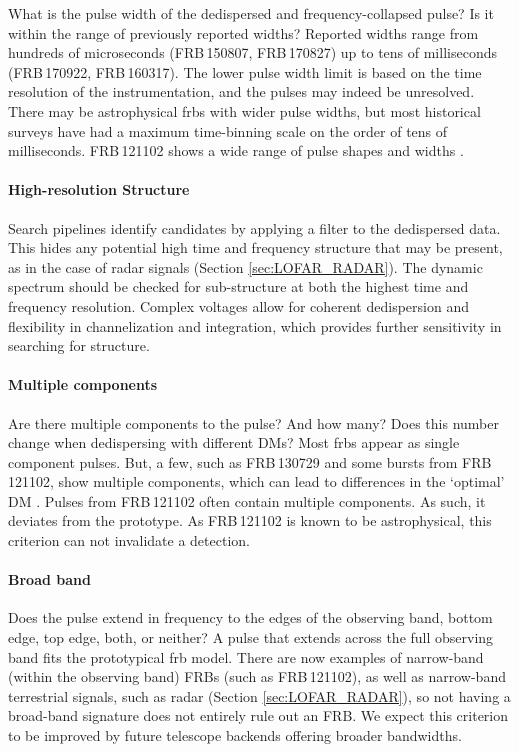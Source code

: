 \documentclass[a4paper,fleqn,usenatbib]{mnras}
\begin{document}
What is the pulse width of the dedispersed and frequency-collapsed pulse? Is it
within the range of previously reported widths? Reported widths range from
hundreds of microseconds (FRB\,150807, FRB\,170827) up to tens of milliseconds
(FRB\,170922, FRB\,160317). The lower pulse width limit is based on the time
resolution of the instrumentation, and the pulses may indeed be unresolved.
There may be astrophysical \glspl{frb} with wider pulse widths, but most
historical surveys have had a maximum time-binning scale on the order of tens of
milliseconds. FRB\,121102 shows a wide range of pulse shapes and widths
\citep{2018Natur.553..182M,atel10675}.

\paragraph{High-resolution Structure}

Search pipelines identify candidates by applying a filter to the dedispersed
data. This hides any potential high time and frequency structure that may be
present, as in the case of radar signals (Section \ref{sec:LOFAR_RADAR}). The
dynamic spectrum should be checked for sub-structure at both the highest time
and frequency resolution. Complex voltages allow for coherent dedispersion and
flexibility in channelization and integration, which provides further
sensitivity in searching for structure.

\paragraph{Multiple components}

Are there multiple components to the pulse? And how many? Does this number
change when dedispersing with different DMs? Most \glspl{frb} appear as single
component pulses. But, a few, such as FRB\,130729 and some bursts from FRB\,121102,
show multiple components, which can lead to differences in the `optimal' DM
\citep{2018Natur.553..182M}. Pulses from FRB\,121102 often contain multiple
components. As such, it deviates from the prototype. As FRB\,121102 is known to
be astrophysical, this criterion can not invalidate a detection.

\paragraph{Broad band}

Does the pulse extend in frequency to the edges of the observing band, bottom
edge, top edge, both, or neither? A pulse that extends across the full observing
band fits the prototypical \gls{frb} model. There are now examples of
narrow-band (within the observing band) FRBs (such as FRB\,121102), as well as
narrow-band terrestrial signals, such as radar (Section \ref{sec:LOFAR_RADAR}),
so not having a broad-band signature does not entirely rule out an FRB.  We
expect this criterion to be improved by future telescope backends offering
broader bandwidths. 
\end{document}
